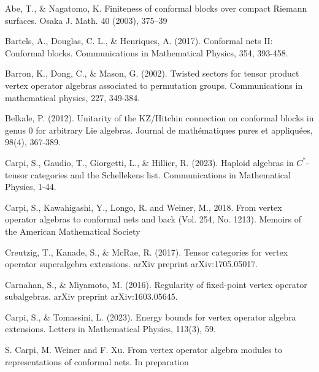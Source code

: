 \documentclass[11pt,b5paper,notitlepage]{article}
\theoremstyle{definition}
\theoremstyle{plain}
\numberwithin{equation}{section}
\begin{document}
\newpage

\printindex	






	\begin{thebibliography}{999999}
		\footnotesize	

Abe, T., \& Nagatomo, K.  Finiteness of conformal blocks over compact Riemann surfaces. Osaka J. Math. 40 (2003), 375–39

Bartels, A., Douglas, C. L., \& Henriques, A. (2017). Conformal nets II: Conformal blocks. Communications in Mathematical Physics, 354, 393-458.



Barron, K., Dong, C., \& Mason, G. (2002). Twisted sectors for tensor product vertex operator algebras associated to permutation groups. Communications in mathematical physics, 227, 349-384.


Belkale, P. (2012). Unitarity of the KZ/Hitchin connection on conformal blocks in genus 0 for arbitrary Lie algebras. Journal de mathématiques pures et appliquées, 98(4), 367-389.




Carpi, S., Gaudio, T., Giorgetti, L., \& Hillier, R. (2023). Haploid algebras in $ C^*$-tensor categories and the Schellekens list. Communications in Mathematical Physics, 1-44.





Carpi, S., Kawahigashi, Y., Longo, R. and Weiner, M., 2018. From vertex operator algebras to conformal nets and back (Vol. 254, No. 1213). Memoirs of the American Mathematical Society


Creutzig, T., Kanade, S., \& McRae, R. (2017). Tensor categories for vertex operator superalgebra extensions. arXiv preprint arXiv:1705.05017.

Carnahan, S., \& Miyamoto, M. (2016). Regularity of fixed-point vertex operator subalgebras. arXiv preprint arXiv:1603.05645.

Carpi, S., \& Tomassini, L. (2023). Energy bounds for vertex operator algebra extensions. Letters in Mathematical Physics, 113(3), 59.


S. Carpi, M. Weiner and F. Xu. From vertex operator algebra modules to representations of conformal nets. In preparation



\end{thebibliography}
\end{document}

